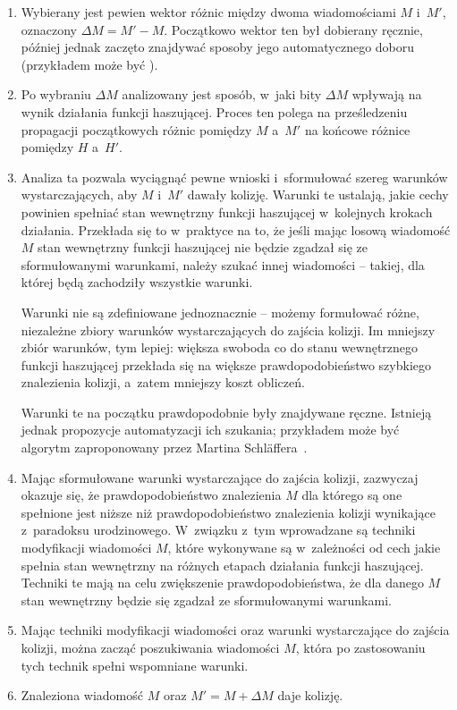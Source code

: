 \begin{enumerate}

\item Wybierany jest pewien wektor różnic między dwoma wiadomościami $M$
i~$M'$, oznaczony $\Delta M = M' - M$. Początkowo wektor ten był dobierany
ręcznie, później jednak zaczęto znajdywać sposoby jego automatycznego
doboru (przykładem może być \cite{sha1_disturbance_vector}).

\item Po wybraniu $\Delta M$ analizowany jest sposób, w~jaki bity $\Delta M$
wpływają na wynik działania funkcji haszującej. Proces ten polega na
prześledzeniu propagacji początkowych różnic pomiędzy $M$ a~$M'$ na końcowe
różnice pomiędzy $H$ a~$H'$.

\item Analiza ta pozwala wyciągnąć pewne wnioski i~sformułować szereg warunków
wystarczających, aby $M$ i~$M'$ dawały kolizję. Warunki te ustalają, jakie
cechy powinien spełniać stan wewnętrzny funkcji haszującej w~kolejnych krokach
działania. Przekłada się to w~praktyce na to, że jeśli mając losową
wiadomość $M$ stan wewnętrzny funkcji haszującej nie będzie zgadzał się ze
sformułowanymi warunkami, należy szukać innej wiadomości -- takiej, dla której
będą zachodziły wszystkie warunki.

Warunki nie są zdefiniowane jednoznacznie -- możemy formułować różne,
niezależne zbiory warunków wystarczających do zajścia kolizji. Im mniejszy
zbiór warunków, tym lepiej: większa swoboda co do stanu wewnętrznego funkcji
haszującej przekłada się na większe prawdopodobieństwo szybkiego znalezienia
kolizji, a~zatem mniejszy koszt obliczeń.

Warunki te na początku prawdopodobnie były znajdywane ręczne. Istnieją jednak
propozycje automatyzacji ich szukania; przykładem może być algorytm
zaproponowany przez Martina Schl{\"a}ffera~\cite{md4_differential_paths}.

\item Mając sformułowane warunki wystarczające do zajścia kolizji, zazwyczaj
okazuje się, że prawdopodobieństwo znalezienia $M$ dla którego są one spełnione
jest niższe niż prawdopodobieństwo znalezienia kolizji wynikające z~paradoksu
urodzinowego. W~związku z~tym wprowadzane są techniki modyfikacji wiadomości
$M$, które wykonywane są w~zależności od cech jakie spełnia stan wewnętrzny na
różnych etapach działania funkcji haszującej. Techniki te mają na celu
zwiększenie prawdopodobieństwa, że dla danego $M$ stan wewnętrzny będzie się
zgadzał ze sformułowanymi warunkami.

\item Mając techniki modyfikacji wiadomości oraz warunki wystarczające do
zajścia kolizji, można zacząć poszukiwania wiadomości $M$, która po
zastosowaniu tych technik spełni wspomniane warunki.

\item Znaleziona wiadomość $M$ oraz $M' = M +\Delta M$ daje kolizję.

\end{enumerate}

